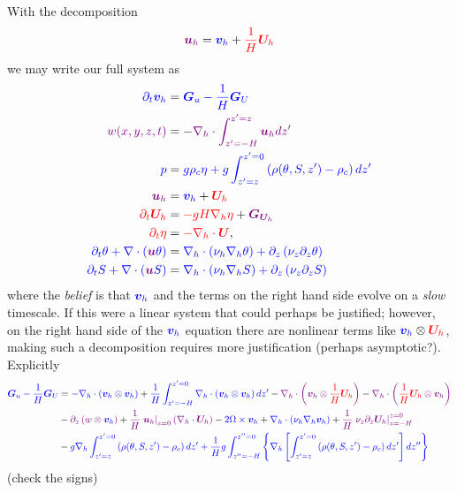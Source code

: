 \documentclass{article}
\newcommand{\cblue}[1]{{\color{blue}#1}}
\newcommand{\cred}[1]{{\color{red}#1}}
\newcommand{\cpurple}[1]{{\color{purple}#1}}
\begin{document}
With the decomposition 
\begin{align}
    \cpurple{\bm{u}_h} = \cblue{\bm{v}_h} + \cred{ \frac{1}{H}\bm{U}_h}
\end{align}
we may write our full system as 
\begin{align}
    \cblue{ \partial_t \bm{v}_h} &=  \cblue{\bm{G}_u - \frac{1}{H} \bm{G}_U }
    \\
    \cpurple{w(x,y,z,t)} &= -   \cpurple{ \nabla_h \cdot \int_{z' = -H}^{z' = z} \bm{u}_h dz' } 
    \\
     \cblue{p} &= \cblue{g \rho_c \eta + g\int^{z' = 0}_{z' = z} \left( \rho(\theta, S, z') - \rho_c \right) dz' }
      \\
    \cpurple{\bm{u}_h} &= \cblue{\bm{v}_h} + \cred{\bm{U}_h}
    \\
    \cred{ \partial_t \bm{U}_h } 
    &= \cred{-gH \nabla_h \eta} + \cpurple{\bm{G}_{\bm{U}_h}} \\
    \cred{ \partial_t \eta } &=\cred{ - \nabla_h \cdot \bm{U}},
    \\
    \cblue{\partial_t \theta + \nabla \cdot \left( \cpurple{\bm{u}} \theta  \right)} &= \cblue{\nabla_h \cdot \left( \nu_h  \nabla_h \theta \right) + \partial_z \left( \nu_z \partial_z \theta \right)}
        \\
      \cblue{\partial_t S + \nabla \cdot \left( \cpurple{\bm{u}} S  \right) } &= \cblue{ \nabla_h \cdot \left( \nu_h  \nabla_h S\right) + \partial_z \left( \nu_z \partial_z S \right) }
\end{align}
where the \textit{belief} is that $\cblue{\bm{v}_h}$ and the terms on the right hand side evolve on a \textit{slow} timescale. If this were a linear system that could perhaps be justified; however, on the right hand side of the $\cblue{\bm{v}_h}$ equation there are nonlinear terms like $\cblue{\bm{v}_h} \otimes \cred{\bm{U}_h}$, making such a decomposition requires more justification (perhaps asymptotic?). Explicitly
\begin{align}
    \cblue{\bm{G}_u - \frac{1}{H} \bm{G}_U } &= 
    \cblue{-\nabla_h \cdot \left( \bm{v}_h \otimes \bm{v}_h  \right) } +   \cblue{ \frac{1}{H}\int_{z' = -H}^{z'=0} \nabla_h \cdot \left( \bm{v}_h \otimes \bm{v}_h  \right) dz' }
    - \cpurple{ \nabla_h \cdot \left( \bm{v}_h \otimes \cred{\frac{1}{H}\bm{U}_h}  \right) } 
    - \cpurple{ \nabla_h \cdot \left( \cred{\frac{1}{H}\bm{U}_h} \otimes \bm{v}_h  \right) }
    \\
    &- \cpurple{\partial_z \left( \cpurple{w} \otimes \cblue{\bm{v}_h} \right)} 
    + \cpurple{ \frac{1}{H}  \left. \bm{u}_h \right|_{z = 0}\left(\nabla_h \cdot \bm{U}_h\right) } 
    - \cblue{ 2 \Omega \times \bm{v}_h }  + \cblue{ \nabla_h \cdot \left( \nu_h  \nabla_h \bm{v}_h \right) } + \cpurple{ \frac{1}{H} \left. \nu_z \partial_z \bm{U}_h \right|_{z=-H}^{z=0} }
    \\
    &-  \cblue{  g\nabla_h \int^{z' = 0}_{z' = z} \left( \rho(\theta, S, z') - \rho_c \right) dz' + \frac{1}{H} g \int_{z''=-H}^{z'' = 0} \left\{ \nabla_h \left[ \int^{z' = 0}_{z' = z} \left( \rho(\theta, S, z') - \rho_c \right) dz' \right] dz'' \right\} }  
\end{align}
\cblue{(check the signs)}
\end{document}
